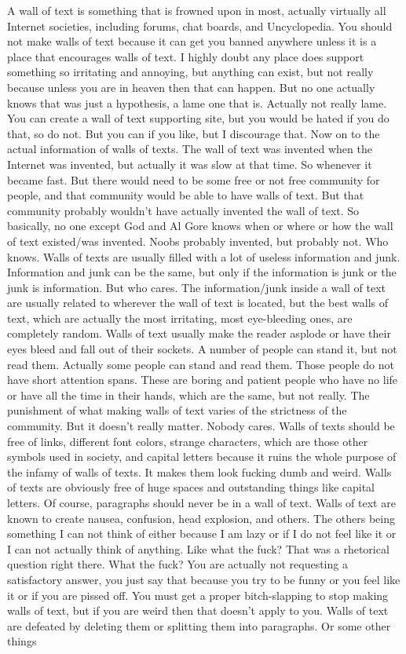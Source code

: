 \documentclass[11pt]{article}
\begin{document}
\begin{center}
\cite{lamport94} A wall of text is something that is frowned upon in most, actually virtually all Internet societies, including forums, chat boards, and Uncyclopedia.
 You should not make walls of text because it can get you banned anywhere unless it is a place that encourages walls of text. I highly doubt any place does support something so irritating and annoying, but anything can exist, but not really because unless you are in heaven then that can happen. But no one actually knows that was just a hypothesis, a lame one that is. Actually not really lame. You can create a wall of text supporting site, but you would be hated if you do that, so do not. But you can if you like, but I discourage that. Now on to the actual information of walls of texts. The wall of text was invented when the Internet was invented, but actually it was slow at that time. So whenever it became fast. But there would need to be some free or not free community for people, and that community would be able to have walls of text. But that community probably wouldn't have actually invented the wall of text. So basically, no one except God and Al Gore knows when or where or how the wall of text existed/was invented. Noobs probably invented, but probably not. Who knows. Walls of texts are usually filled with a lot of useless information and junk. Information and junk can be the same, but only if the information is junk or the junk is information. But who cares. The information/junk inside a wall of text are usually related to wherever the wall of text is located, but the best walls of text, which are actually the most irritating, most eye-bleeding ones, are completely random. Walls of text usually make the reader asplode or have their eyes bleed and fall out of their sockets. A number of people can stand it, but not read them. Actually some people can stand and read them. Those people do not have short attention spans. These are boring and patient people who have no life or have all the time in their hands, which are the same, but not really. The punishment of what making walls of text varies of the strictness of the community. But it doesn't really matter. Nobody cares. Walls of texts should be free of links, different font colors, strange characters, which are those other symbols used in society, and capital letters because it ruins the whole purpose of the infamy of walls of texts. It makes them look fucking dumb and weird. Walls of texts are obviously free of huge spaces and outstanding things like capital letters. Of course, paragraphs should never be in a wall of text. Walls of text are known to create nausea, confusion, head explosion, and others. The others being something I can not think of either because I am lazy or if I do not feel like it or I can not actually think of anything. Like what the fuck? That was a rhetorical question right there. What the fuck? You are actually not requesting a satisfactory answer, you just say that because you try to be funny or you feel like it or if you are pissed off. You must get a proper bitch-slapping to stop making walls of text, but if you are weird then that doesn't apply to you. Walls of text are defeated by deleting them or splitting them into paragraphs. Or some other things 
\end{center}
\end{document}
